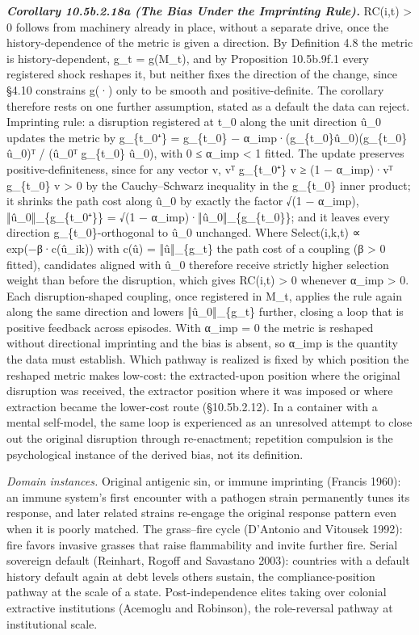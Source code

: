 \documentclass[
]{article}
\begin{document}
\emph{\textbf{Corollary 10.5b.2.18a (The Bias Under the Imprinting
Rule).}} RC(i,t) \textgreater{} 0 follows from machinery already in
place, without a separate drive, once the history-dependence of the
metric is given a direction. By Definition 4.8 the metric is
history-dependent, g\_t = g(M\_t), and by Proposition 10.5b.9f.1 every
registered shock reshapes it, but neither fixes the direction of the
change, since §4.10 constrains g(·) only to be smooth and
positive-definite. The corollary therefore rests on one further
assumption, stated as a default the data can reject. Imprinting rule: a
disruption registered at t\_0 along the unit direction û\_0 updates the
metric by g\_\{t\_0⁺\} = g\_\{t\_0\} −
α\_imp·(g\_\{t\_0\}û\_0)(g\_\{t\_0\}û\_0)ᵀ / (û\_0ᵀ g\_\{t\_0\} û\_0),
with 0 ≤ α\_imp \textless{} 1 fitted. The update preserves
positive-definiteness, since for any vector v, vᵀ g\_\{t\_0⁺\} v ≥ (1 −
α\_imp)·vᵀ g\_\{t\_0\} v \textgreater{} 0 by the Cauchy--Schwarz
inequality in the g\_\{t\_0\} inner product; it shrinks the path cost
along û\_0 by exactly the factor √(1 − α\_imp), ‖û\_0‖\_\{g\_\{t\_0⁺\}\}
= √(1 − α\_imp)·‖û\_0‖\_\{g\_\{t\_0\}\}; and it leaves every direction
g\_\{t\_0\}-orthogonal to û\_0 unchanged. Where Select(i,k,t) ∝
exp(−β·c(û\_ik)) with c(û) = ‖û‖\_\{g\_t\} the path cost of a coupling
(β \textgreater{} 0 fitted), candidates aligned with û\_0 therefore
receive strictly higher selection weight than before the disruption,
which gives RC(i,t) \textgreater{} 0 whenever α\_imp \textgreater{} 0.
Each disruption-shaped coupling, once registered in M\_t, applies the
rule again along the same direction and lowers ‖û\_0‖\_\{g\_t\} further,
closing a loop that is positive feedback across episodes. With α\_imp =
0 the metric is reshaped without directional imprinting and the bias is
absent, so α\_imp is the quantity the data must establish. Which pathway
is realized is fixed by which position the reshaped metric makes
low-cost: the extracted-upon position where the original disruption was
received, the extractor position where it was imposed or where
extraction became the lower-cost route (§10.5b.2.12). In a container
with a mental self-model, the same loop is experienced as an unresolved
attempt to close out the original disruption through re-enactment;
repetition compulsion is the psychological instance of the derived bias,
not its definition.

\emph{Domain instances.} Original antigenic sin, or immune imprinting
(Francis 1960): an immune system's first encounter with a pathogen
strain permanently tunes its response, and later related strains
re-engage the original response pattern even when it is poorly matched.
The grass--fire cycle (D'Antonio and Vitousek 1992): fire favors
invasive grasses that raise flammability and invite further fire. Serial
sovereign default (Reinhart, Rogoff and Savastano 2003): countries with
a default history default again at debt levels others sustain, the
compliance-position pathway at the scale of a state. Post-independence
elites taking over colonial extractive institutions (Acemoglu and
Robinson), the role-reversal pathway at institutional scale.
\end{document}
